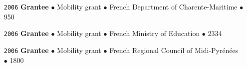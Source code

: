 \begin{itemize}[leftmargin=5.8em, labelsep=1.5em]
    \item[\texttt{2006}] \textbf{Grantee} $\bullet$ Mobility grant $\bullet$ French Department of Charente-Maritime $\bullet$ 950 \texteuro

    \item[\texttt{2006}] \textbf{Grantee} $\bullet$ Mobility grant $\bullet$ French Ministry of Education $\bullet$ 2334 \texteuro
    
    \item[\texttt{2006}] \textbf{Grantee} $\bullet$ Mobility grant $\bullet$ French Regional Council of Midi-Pyrénées $\bullet$ 1800 \texteuro
    
\end{itemize}